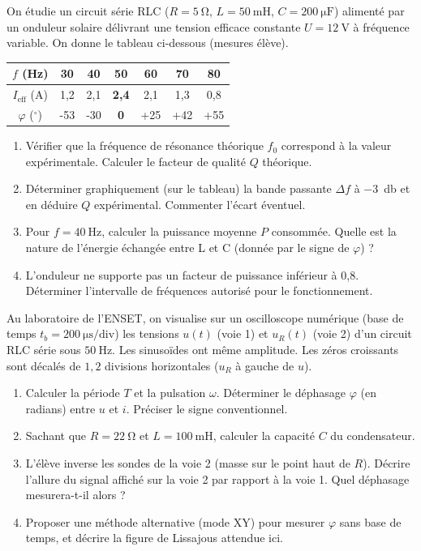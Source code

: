 \documentclass[11pt]{article}
\begin{document}
\begin{exercice}
On étudie un circuit série RLC ($R=\SI{5}{\ohm}$, $L=\SI{50}{\milli\henry}$, $C=\SI{200}{\micro\farad}$) alimenté par un onduleur solaire délivrant une tension efficace constante $U=\SI{12}{\volt}$ à fréquence variable. On donne le tableau ci-dessous (mesures élève).
\begin{center}
\begin{tabular}{|c|c|c|c|c|c|c|}
\hline
$f$ (Hz) & 30 & 40 & \textbf{50} & 60 & 70 & 80 \\ \hline
$I_{\text{eff}}$ (A) & 1,2 & 2,1 & \textbf{2,4} & 2,1 & 1,3 & 0,8 \\ \hline
$\varphi$ ($^\circ$) & -53 & -30 & \textbf{0} & +25 & +42 & +55 \\ \hline
\end{tabular}
\end{center}
\begin{enumerate}
    \item Vérifier que la fréquence de résonance théorique $f_0$ correspond à la valeur expérimentale. Calculer le facteur de qualité $Q$ théorique.
    \item Déterminer graphiquement (sur le tableau) la bande passante $\Delta f$ à \SI{-3}{\decibel} et en déduire $Q$ expérimental. Commenter l'écart éventuel.
    \item Pour $f=\SI{40}{\hertz}$, calculer la puissance moyenne $P$ consommée. Quelle est la nature de l'énergie échangée entre L et C (donnée par le signe de $\varphi$) ?
    \item L'onduleur ne supporte pas un facteur de puissance inférieur à 0,8. Déterminer l'intervalle de fréquences autorisé pour le fonctionnement.
\end{enumerate}
\end{exercice}

\begin{exercice}
Au laboratoire de l'ENSET, on visualise sur un oscilloscope numérique (base de temps $t_b=\SI{200}{\micro\second}/\text{div}$) les tensions $u(t)$ (voie 1) et $u_R(t)$ (voie 2) d'un circuit RLC série sous $\SI{50}{\hertz}$. Les sinusoïdes ont même amplitude. Les zéros croissants sont décalés de $1,2$ divisions horizontales ($u_R$ à gauche de $u$).
\begin{enumerate}
    \item Calculer la période $T$ et la pulsation $\omega$. Déterminer le déphasage $\varphi$ (en radians) entre $u$ et $i$. Préciser le signe conventionnel.
    \item Sachant que $R=\SI{22}{\ohm}$ et $L=\SI{100}{\milli\henry}$, calculer la capacité $C$ du condensateur.
    \item L'élève inverse les sondes de la voie 2 (masse sur le point haut de $R$). Décrire l'allure du signal affiché sur la voie 2 par rapport à la voie 1. Quel déphasage mesurera-t-il alors ?
    \item Proposer une méthode alternative (mode XY) pour mesurer $\varphi$ sans base de temps, et décrire la figure de Lissajous attendue ici.
\end{enumerate}
\end{exercice}
\end{document}
